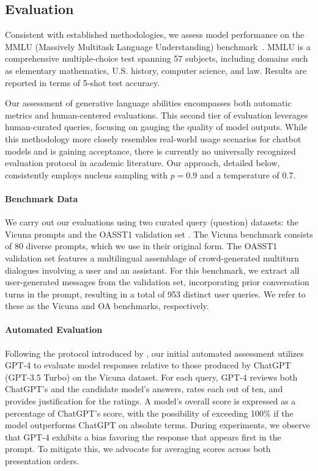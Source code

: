 \subsection{Evaluation}

Consistent with established methodologies, we assess model performance on the MMLU (Massively Multitask Language Understanding) benchmark~\citep{hendrycksmeasuring}. MMLU is a comprehensive multiple-choice test spanning 57 subjects, including domains such as elementary mathematics, U.S. history, computer science, and law. Results are reported in terms of 5-shot test accuracy.

Our assessment of generative language abilities encompasses both automatic metrics and human-centered evaluations. This second tier of evaluation leverages human-curated queries, focusing on gauging the quality of model outputs. While this methodology more closely resembles real-world usage scenarios for chatbot models and is gaining acceptance, there is currently no universally recognized evaluation protocol in academic literature. Our approach, detailed below, consistently employs nucleus sampling with $p=0.9$ and a temperature of $0.7$.

\paragraph{Benchmark Data} We carry out our evaluations using two curated query (question) datasets: the Vicuna prompts \citep{vicuna2023} and the OASST1 validation set \citep{kopf2023openassistant}. The Vicuna benchmark consists of 80 diverse prompts, which we use in their original form. The OASST1 validation set features a multilingual assemblage of crowd-generated multiturn dialogues involving a user and an assistant. For this benchmark, we extract all user-generated messages from the validation set, incorporating prior conversation turns in the prompt, resulting in a total of 953 distinct user queries. We refer to these as the Vicuna and OA benchmarks, respectively.

\paragraph{Automated Evaluation} Following the protocol introduced by \citet{vicuna2023}, our initial automated assessment utilizes GPT-4 to evaluate model responses relative to those produced by ChatGPT (GPT-3.5 Turbo) on the Vicuna dataset. For each query, GPT-4 reviews both ChatGPT’s and the candidate model’s answers, rates each out of ten, and provides justification for the ratings. A model’s overall score is expressed as a percentage of ChatGPT’s score, with the possibility of exceeding 100\% if the model outperforms ChatGPT on absolute terms. During experiments, we observe that GPT-4 exhibits a bias favoring the response that appears first in the prompt. To mitigate this, we advocate for averaging scores across both presentation orders.

